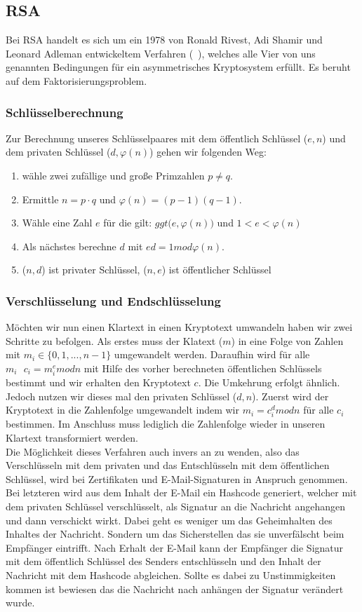 \documentclass[paper=a4,11pt,german]{scrartcl} %
\begin{document}
\subsection{RSA}
Bei RSA handelt es sich um ein 1978 von Ronald Rivest, Adi Shamir und Leonard Adleman entwickeltem Verfahren (~\cite{Eckert13}), welches   alle Vier von uns genannten Bedingungen für ein asymmetrisches Kryptosystem erfüllt. Es beruht auf dem Faktorisierungsproblem.

\subsubsection{Schlüsselberechnung}
Zur Berechnung unseres Schlüsselpaares mit dem öffentlich Schlüssel ($e,n$) und dem privaten Schlüssel ($d,\varphi(n)$) gehen wir folgenden Weg:
\begin{enumerate}
\item wähle zwei zufällige und große Primzahlen $p\neq q$.
\item Ermittle $n = p \cdot q$ und $\varphi(n) = (p-1)(q-1)$.
\item Wähle eine Zahl $e$ für die gilt: $ggt\Big(e,\varphi(n)\Big)$ und $1<e<\varphi(n)$
\item Als nächstes berechne $d$ mit $ed = 1 mod \varphi(n)$.
\item ($n,d$) ist privater Schlüssel, ($n,e$) ist öffentlicher Schlüssel
\end{enumerate} 

\subsubsection{Verschlüsselung und Endschlüsselung}
Möchten wir nun einen Klartext in einen Kryptotext umwandeln haben wir zwei Schritte zu befolgen. Als erstes muss der Klatext ($m$) in eine Folge von Zahlen mit $m_i \in \{0,1,...,n-1\}$ umgewandelt werden. Daraufhin wird für alle $m_i~~~c_i=m^e_i mod n$ mit Hilfe des vorher berechneten öffentlichen Schlüssels bestimmt und wir erhalten den Kryptotext $c$. %
Die Umkehrung erfolgt ähnlich. Jedoch nutzen wir dieses mal den privaten Schlüssel ($d,n$). Zuerst wird der Kryptotext in die Zahlenfolge umgewandelt indem wir $m_i = c^d_i mod n$ für alle $c_i$ bestimmen. Im Anschluss muss lediglich die Zahlenfolge wieder in unseren Klartext transformiert werden.
\ \\

Die Möglichkeit dieses Verfahren auch invers an zu wenden, also das Verschlüsseln mit dem privaten und das Entschlüsseln mit dem öffentlichen Schlüssel, wird bei Zertifikaten und E-Mail-Signaturen in Anspruch genommen. Bei letzteren wird aus dem Inhalt der E-Mail ein Hashcode generiert, welcher mit dem privaten Schlüssel verschlüsselt, als Signatur an die Nachricht angehangen und dann verschickt wirkt. Dabei geht es weniger um das Geheimhalten des Inhaltes der Nachricht. Sondern um das Sicherstellen das sie unverfälscht beim Empfänger eintrifft. Nach Erhalt der E-Mail kann der Empfänger die Signatur mit dem öffentlich Schlüssel des Senders entschlüsseln und den Inhalt der Nachricht mit dem Hashcode abgleichen. Sollte es dabei zu Unstimmigkeiten kommen ist bewiesen das die Nachricht nach anhängen der Signatur verändert wurde.
\end{document}
